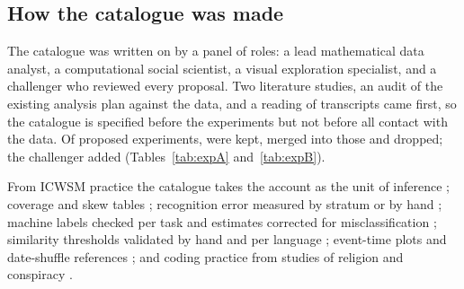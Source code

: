 \documentclass[letterpaper]{article} %
\begin{document}
\subsection{How the catalogue was made}

The catalogue was written on \SnapDate{} by a panel of \NPanelRoles{} roles: a lead mathematical data analyst, a computational social scientist, a visual exploration specialist, and a challenger who reviewed every proposal. Two literature studies, an audit of the existing analysis plan against the data, and a reading of \ReadN{} transcripts came first, so the catalogue is specified before the experiments but not before all contact with the data. Of \NProposed{} proposed experiments, \NKept{} were kept, \NMerged{} merged into those and \NDropped{} dropped; the challenger added \NAdded{} (Tables~\ref{tab:expA} and~\ref{tab:expB}).

From ICWSM practice the catalogue takes the account as the unit of inference \cite{colglazier2024effects,zhang2017community,hu2022quotatives}; coverage and skew tables \cite{sosnovik2025times,hortaribeiro2020youniverse}; recognition error measured by stratum or by hand \cite{rai2023deep,litterer2024mapping}; machine labels checked per task and estimates corrected for misclassification \cite{pangakis2024keeping,teblunthuis2023misclassification}; similarity thresholds validated by hand and per language \cite{hanley2022happenstance,hanley2023partial}; event-time plots and date-shuffle references \cite{attanasio2025effects,hortaribeiro2020sudden,gerard2025bridging,roytburg2024words}; and coding practice from studies of religion and conspiracy \cite{chen2025digital,liaw2023younicon,papasavva2021gospel,fawzi2025fabricating}.
\end{document}
